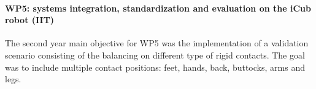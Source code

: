 \paragraph{WP5: systems integration, standardization and evaluation on the iCub robot (IIT)}

The second year main objective for WP5 was the implementation of a validation scenario consisting of the balancing on different type of rigid contacts. The goal was to include multiple contact positions: feet, hands, back, buttocks, arms and legs. 
